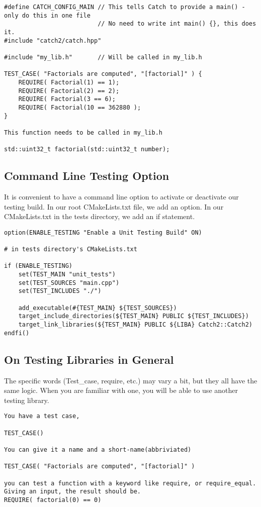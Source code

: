 \begin{verbatim}
#define CATCH_CONFIG_MAIN // This tells Catch to provide a main() - only do this in one file
                          // No need to write int main() {}, this does it. 
#include "catch2/catch.hpp"

#include "my_lib.h"       // Will be called in my_lib.h

TEST_CASE( "Factorials are computed", "[factorial]" ) {
    REQUIRE( Factorial(1) == 1);
    REQUIRE( Factorial(2) == 2);
    REQUIRE( Factorial(3 == 6);
    REQUIRE( Factorial(10 == 362880 );
}

This function needs to be called in my_lib.h

std::uint32_t factorial(std::uint32_t number);
\end{verbatim}


\subsection{Command Line Testing Option}

It is convenient to have a command line option to activate or deactivate our testing build. In our root CMakeLists.txt
file, we add an option. In our CMakeLists.txt in the tests directory, we add an if statement. 

\begin{verbatim}
option(ENABLE_TESTING "Enable a Unit Testing Build" ON) 

# in tests directory's CMakeLists.txt

if (ENABLE_TESTING)
    set(TEST_MAIN "unit_tests")
    set(TEST_SOURCES "main.cpp")
    set(TEST_INCLUDES "./")

    add_executable(#{TEST_MAIN} ${TEST_SOURCES})
    target_include_directories(${TEST_MAIN} PUBLIC ${TEST_INCLUDES})
    target_link_libraries(${TEST_MAIN} PUBLIC ${LIBA} Catch2::Catch2)
endfi()
\end{verbatim}


\subsection{On Testing Libraries in General}

The specific words (Test\_case, require, etc.) may vary a bit, but they all have the same logic. When you are familiar with one, 
you will be able to use another testing library.

\begin{verbatim}
You have a test case, 

TEST_CASE()

You can give it a name and a short-name(abbriviated)

TEST_CASE( "Factorials are computed", "[factorial]" )

you can test a function with a keyword like require, or require_equal. Giving an input, the result should be. 
REQUIRE( factorial(0) == 0)
\end{verbatim}

